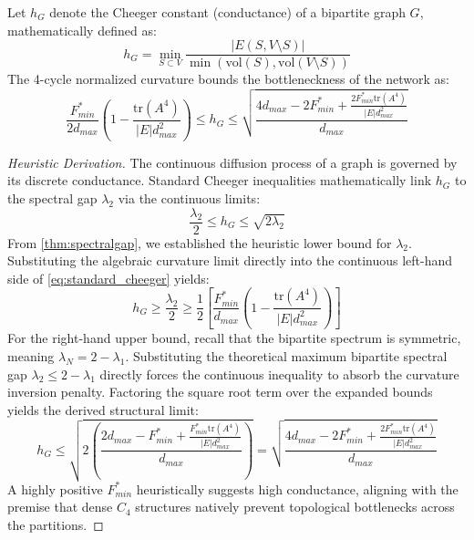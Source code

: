 \documentclass{siuro250211}
\begin{document}
\begin{proposition}
\label{thm:cheeger}
Let $h_G$ denote the Cheeger constant (conductance) of a bipartite graph $G$, mathematically defined as:
\begin{equation*}
h_G = \min_{S \subset V} \frac{|E(S, V \setminus S)|}{\min(\text{vol}(S), \text{vol}(V \setminus S))}
\end{equation*}
The 4-cycle normalized curvature bounds the bottleneckness of the network as:
\begin{equation}
\frac{F_{min}^*}{2 d_{max}} \left( 1 - \frac{\text{tr}(A^4)}{|E| d_{max}^2} \right) \le h_G \le \sqrt{\frac{4 d_{max} - 2F_{min}^* + \frac{2 F_{min}^* \text{tr}(A^4)}{|E| d_{max}^2}}{d_{max}}}
\end{equation}
\end{proposition}

\begin{proof}[Heuristic Derivation]
The continuous diffusion process of a graph is governed by its discrete conductance. Standard Cheeger inequalities mathematically link $h_G$ to the spectral gap $\lambda_2$ via the continuous limits:
\begin{equation}
\label{eq:standard_cheeger}
\frac{\lambda_2}{2} \le h_G \le \sqrt{2 \lambda_2}
\end{equation}
From \cref{thm:spectralgap}, we established the heuristic lower bound for $\lambda_2$. Substituting the algebraic curvature limit directly into the continuous left-hand side of \cref{eq:standard_cheeger} yields:
\begin{equation}
h_G \ge \frac{\lambda_2}{2} \ge \frac{1}{2} \left[ \frac{F_{min}^*}{d_{max}} \left( 1 - \frac{\text{tr}(A^4)}{|E| d_{max}^2} \right) \right]
\end{equation}
For the right-hand upper bound, recall that the bipartite spectrum is symmetric, meaning $\lambda_N = 2 - \lambda_1$. Substituting the theoretical maximum bipartite spectral gap $\lambda_2 \le 2 - \lambda_1$ directly forces the continuous inequality to absorb the curvature inversion penalty. Factoring the square root term over the expanded bounds yields the derived structural limit:
\begin{equation}
h_G \le \sqrt{2 \left( \frac{2d_{max} - F_{min}^* + \frac{F_{min}^* \text{tr}(A^4)}{|E| d_{max}^2}}{d_{max}} \right)} = \sqrt{\frac{4 d_{max} - 2F_{min}^* + \frac{2 F_{min}^* \text{tr}(A^4)}{|E| d_{max}^2}}{d_{max}}}
\end{equation}
A highly positive $F_{min}^*$ heuristically suggests high conductance, aligning with the premise that dense $C_4$ structures natively prevent topological bottlenecks across the partitions.
\end{proof}
\end{document}

